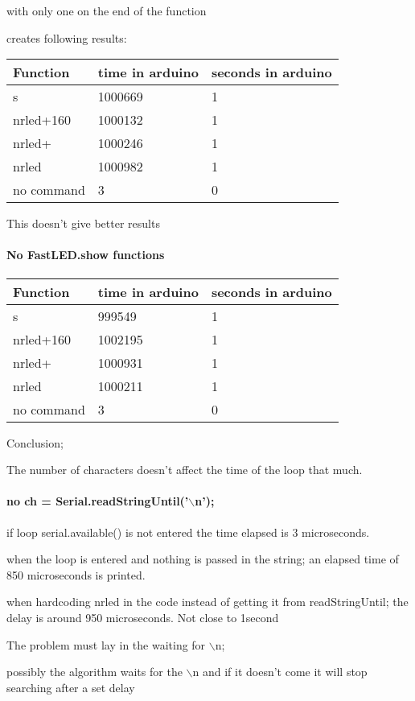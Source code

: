 \documentclass{scrartcl}
\begin{document}
with only one on the end of the function

creates following results:

\begin{tabular}{ |l|l|l| }
\hline
 Function & time in arduino & seconds in arduino \tabularnewline
\hline
\hline
 s & 1000669 & 1 \tabularnewline
\hline
 nrled+160 & 1000132 & 1 \tabularnewline
\hline
 nrled+ & 1000246 & 1 \tabularnewline
\hline
 nrled & 1000982 & 1 \tabularnewline
\hline
 no command & 3 & 0 \tabularnewline
\hline
\end{tabular}


This doesn't give better results



\paragraph{No FastLED.show functions}

\begin{tabular}{ |l|l|l| }
\hline
 Function & time in arduino & seconds in arduino \tabularnewline
\hline
\hline
 s & 999549 & 1 \tabularnewline
\hline
 nrled+160 & 1002195 & 1 \tabularnewline
\hline
 nrled+ & 1000931 & 1 \tabularnewline
\hline
 nrled & 1000211 & 1 \tabularnewline
\hline
 no command & 3 & 0 \tabularnewline
\hline
\end{tabular}


Conclusion;

The number of characters doesn't affect the time of the loop that much.



\paragraph{no ch = Serial.readStringUntil('$\backslash$n');}

if loop serial.available() is not entered the time elapsed is 3 microseconds.

when the loop is entered and nothing is passed in the string; an elapsed time of 850 microseconds is printed. 

when hardcoding nrled in the code instead of getting it from readStringUntil; the delay is around 950 microseconds. Not close to 1second



The problem must lay in the waiting for $\backslash$n;

possibly the algorithm waits for the $\backslash$n and if it doesn't come it will stop searching after a set delay
\end{document}
